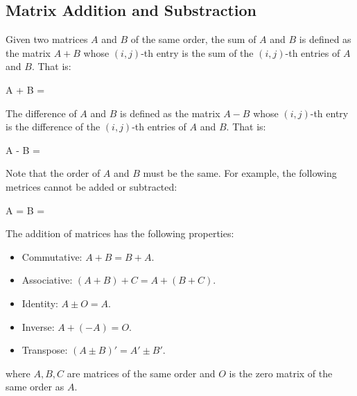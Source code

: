\documentclass{report}
\begin{document}
\begin{multicols}{2}
  \section{Matrix Addition and Substraction}

  \doublespacing{}

  Given two matrices $A$ and $B$ of the same order, the sum of $A$ and $B$ is
  defined as the matrix $A + B$ whose $(i, j)$-th entry is the sum of the $(i,
    j)$-th entries of $A$ and $B$. That is: \begin{cequation}
    A + B = 
  \end{cequation}

  The difference of $A$ and $B$ is defined as the matrix $A - B$ whose $(i,
    j)$-th entry is the difference of the $(i, j)$-th entries of $A$ and $B$. That
  is: \begin{cequation}
    A - B = 
  \end{cequation}

  Note that the order of $A$ and $B$ must be the same. For example, the following
  metrices cannot be added or subtracted:
  \begin{cequation}
    A = 
    B = 
  \end{cequation}

  \noindent The addition of matrices has the following properties: \begin{itemize}
    \item Commutative: $A + B = B + A$.
    \item Associative: $(A + B) + C = A + (B + C)$.
    \item Identity: $A \pm O = A$.
    \item Inverse: $A + (-A) = O$.
    \item Transpose: $(A \pm B)' = A' \pm B'$.
  \end{itemize}
  where $A, B, C$ are matrices of the same order and $O$ is the zero matrix of the
  same order as $A$.


\end{multicols}
\end{document}
